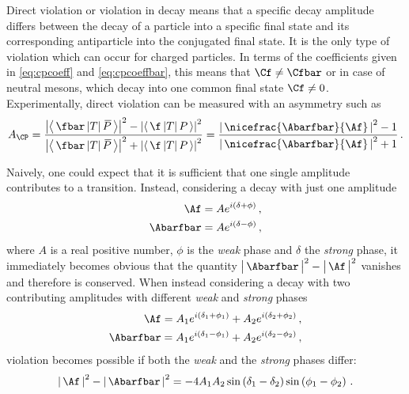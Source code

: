 Direct \CP violation or \CP violation in decay means that a specific decay amplitude differs between the decay of a particle into a specific final state and its corresponding antiparticle into the conjugated final state.
It is the only type of \CP violation which can occur for charged particles.
In terms of the \CP coefficients given in \cref{eq:cpcoeff} and \cref{eq:cpcoeffbar}, this means that $\Cf\neq\Cfbar$ or in case of neutral mesons, which decay into one common final state $\Cf\neq0$.
Experimentally, direct \CP violation can be measured with an asymmetry such as
\begin{equation}
A_{\CP}=\frac{\left|\left<\,\fbar\,|T|\,\kern 0.18em\overline{\kern -0.18em P}\,\right>\right|^2-\left|\left<\,\f\,|T|\,P\,\right>\right|^2}{\left|\left<\,\fbar\,|T|\,\kern 0.18em\overline{\kern -0.18em P}\,\right>\right|^2+\left|\left<\,\f\,|T|\,P\,\right>\right|^2} = \frac{\left|\,\nicefrac{\Abarfbar}{\Af}\,\right|^2-1}{\left|\,\nicefrac{\Abarfbar}{\Af}\,\right|^2+1}\,.
\end{equation}

Naively, one could expect that it is sufficient that one single amplitude contributes to a transition.
Instead, considering a decay with just one amplitude
\begin{equation}
\begin{split}
\Af&=Ae^{i\left(\delta+\phi\right)}\,,\\
\Abarfbar&=Ae^{i\left(\delta-\phi\right)}\,,
\end{split}
\end{equation}
where $A$ is a real positive number, $\phi$ is the \emph{weak} phase and $\delta$ the \emph{strong} phase, it immediately becomes obvious that the quantity $\big|\,\Abarfbar\,\big|^2-\big|\,\Af\,\big|^2$ vanishes and therefore \CP is conserved.
When instead considering a decay with two contributing amplitudes with different \emph{weak} and \emph{strong} phases
\begin{equation}
\begin{split}
\Af=A_1e^{i\left(\delta_1+\phi_1\right)}+A_2e^{i\left(\delta_2+\phi_2\right)}\,,\\
\Abarfbar=A_1e^{i\left(\delta_1-\phi_1\right)}+A_2e^{i\left(\delta_2-\phi_2\right)}\,,
\end{split}
\end{equation}
\CP violation becomes possible if both the \emph{weak} and the \emph{strong} phases differ:
\begin{equation}
\left|\,\Af\,\right|^2-\left|\,\Abarfbar\,\right|^2=-4A_1A_2\sin\left(\delta_1-\delta_2\right)\sin\left(\phi_1-\phi_2\right)\,.
\end{equation}

